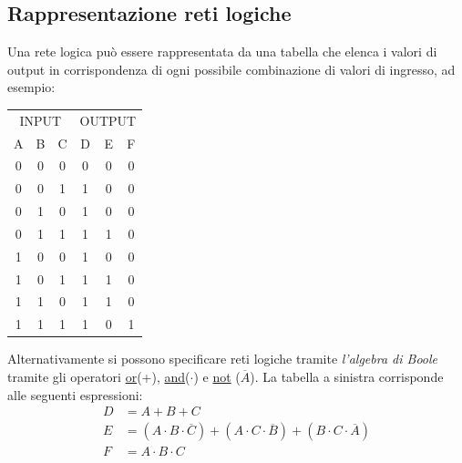 \subsection{Rappresentazione reti logiche}\label{RappRetiLogiche}
Una rete logica può essere rappresentata da una tabella che elenca i valori di output in corrispondenza di ogni possibile combinazione di valori di ingresso, ad esempio:
\vskip3mm
\begin{minipage}[c]{0.30\textwidth}
	\begin{tabular}[t]{|ccc|ccc|}
		\hline \multicolumn{3}{|c|}{ INPUT } & \multicolumn{3}{|c|}{ OUTPUT }                 \\
		A                                    & B                              & C & D & E & F \\
		\hline
		0                                    & 0                              & 0 & 0 & 0 & 0 \\
		0                                    & 0                              & 1 & 1 & 0 & 0 \\
		0                                    & 1                              & 0 & 1 & 0 & 0 \\
		0                                    & 1                              & 1 & 1 & 1 & 0 \\
		1                                    & 0                              & 0 & 1 & 0 & 0 \\
		1                                    & 0                              & 1 & 1 & 1 & 0 \\
		1                                    & 1                              & 0 & 1 & 1 & 0 \\
		1                                    & 1                              & 1 & 1 & 0 & 1 \\
		\hline
	\end{tabular}
\end{minipage}
%
\begin{minipage}[c]{0.69\textwidth}
	Alternativamente si possono specificare reti logiche tramite \textit{l'algebra di Boole} tramite gli operatori \underline{or}(+), \underline{and}($ \cdot  $) e \underline{not} ($\overline{A}$). La tabella a sinistra corrisponde alle seguenti espressioni:
	\begin{align*}
		D & = A + B + C                                                                                                                           \\
		E & = \left(A \cdot  B \cdot \overline{C}\right) + \left(A \cdot  C \cdot \overline{B}\right) + \left(B \cdot C \cdot \overline{A}\right) \\
		F & = A \cdot  B \cdot C
	\end{align*}
\end{minipage}
